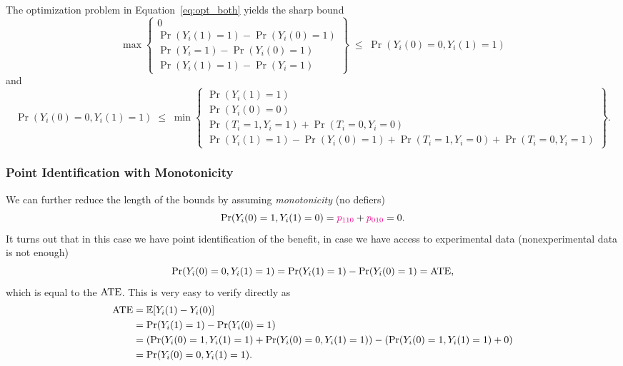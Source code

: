 \documentclass[11pt]{exam}
\begin{document}
\begin{theorem}
    The optimization problem in Equation~\eqref{eq:opt_both} yields the sharp bound
    \begin{equation*}
    \max\!\left\{
    \begin{array}{c}
    0\\[6pt]
    \Pr(Y_i(1)=1)-\Pr(Y_i(0)=1)\\[6pt]
    \Pr(Y_i=1)-\Pr(Y_i(0)=1)\\[6pt]
    \Pr(Y_i(1)=1)-\Pr(Y_i=1)
    \end{array}
    \right\}
    \;\le\;
    \Pr(Y_i(0) = 0, Y_i(1) = 1)
    \label{eq:lower-bound-both}
    \end{equation*}
    and
    \begin{equation*}
    \Pr(Y_i(0) = 0, Y_i(1) = 1)
    \;\le\;
    \min\!\left\{
    \begin{array}{c}
    \Pr(Y_i(1)=1)\\[6pt]
    \Pr(Y_i(0)=0)\\[6pt]
    \Pr(T_i=1,Y_i=1)+\Pr(T_i=0,Y_i=0)\\[6pt]
    \Pr(Y_i(1)=1)-\Pr(Y_i(0)=1)
    +\Pr(T_i=1,Y_i=0)+\Pr(T_i=0,Y_i=1)
    \end{array}
    \right\}.
    \label{eq:upper-bound-both}
    \end{equation*}
\end{theorem}

\subsubsection{Point Identification with Monotonicity}
We can further reduce the length of the bounds by assuming \emph{monotonicity} (no defiers)
\[
    \Pr(Y_i(0) = 1, Y_i(1) = 0) = \textcolor{magenta}{p_{1 1 0}} + \textcolor{magenta}{p_{0 1 0 }} = 0.
\]
It turns out that in this case we have point identification of the benefit, in case we have access to experimental data (nonexperimental data is not enough)
\[
    \Pr(Y_i(0) = 0, Y_i(1) = 1) = \Pr(Y_i(1) = 1) - \Pr(Y_i(0) = 1) = \mathrm{ATE},
\]
which is equal to the $\mathrm{ATE}$.
This is very easy to verify directly as 
\begin{align*}
    \mathrm{ATE} &= \mathbb{E}[Y_i(1) - Y_i(0)]
    \\
    &= \Pr(Y_i(1) = 1) - \Pr(Y_i(0) = 1)
    \\
    &= (\Pr(Y_i(0) = 1, Y_i(1) = 1) + \Pr(Y_i(0) = 0, Y_i(1) = 1)) - (\Pr(Y_i(0) = 1, Y_i(1) = 1) + 0)
    \\
    &= \Pr(Y_i(0) = 0, Y_i(1) = 1).
\end{align*}
\end{document}
